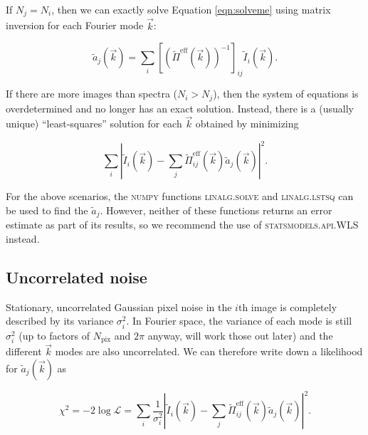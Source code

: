 \documentclass{article}
\begin{document}
If $N_j = N_i$, then we can exactly solve Equation \ref{eqn:solveme} using matrix inversion for each
Fourier mode $\vec{k}$:

\begin{equation}
  \tilde{a}_j(\vec{k}) = \sum_i [(\tilde{\Pi}^\mathrm{eff}(\vec{k}))^{-1}]_{ij} \tilde{I}_i(\vec{k}).
\end{equation}


If there are more images than spectra ($N_i > N_j$), then the system of equations is overdetermined
and no longer has an exact solution.  Instead, there is a (usually unique) ``least-squares''
solution for each $\vec{k}$ obtained by minimizing

\begin{equation}
  \label{eqn:lstsq}
  \sum_i\left|\tilde{I}_i(\vec{k}) - \sum_j \tilde{\Pi}^\mathrm{eff}_{ij}(\vec{k}) \tilde{a}_j(\vec{k})\right|^2.
\end{equation}

For the above scenarios, the \textsc{numpy} functions \textsc{linalg.solve} and
\textsc{linalg.lstsq} can be used to find the $\tilde{a}_j$.  However, neither of these functions
returns an error estimate as part of its results, so we recommend the use of
\textsc{statsmodels.api.WLS} instead.


\subsection{Uncorrelated noise}

Stationary, uncorrelated Gaussian pixel noise in the $i$th image is completely described by its
variance $\sigma^2_i$.  In Fourier space, the variance of each mode is still $\sigma^2_i$ (up to
factors of $N_\mathrm{pix}$ and $2 \pi$ anyway, will work those out later) and the different
$\vec{k}$ modes are also uncorrelated.  We can therefore write down a likelihood for
$\tilde{a}_j(\vec{k})$ as

\begin{equation}
    \label{eqn:like}
    \chi^2 = -2 \log \mathcal{L} = \sum_i\frac{1}{\sigma_i^2}\left|\tilde{I}_i(\vec{k}) - \sum_j \tilde{\Pi}^\mathrm{eff}_{ij}(\vec{k}) \tilde{a}_j(\vec{k})\right|^2.
\end{equation}
\end{document}
